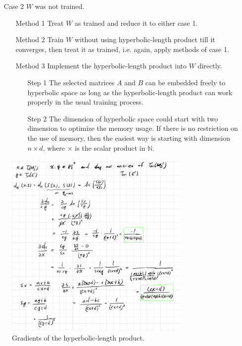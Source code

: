 \documentclass{article}
\theoremstyle{plain}
\theoremstyle{plain} %
\theoremstyle{definition}  %
\theoremstyle{remark}  %
\theoremstyle{plain}
\begin{document}
\begin{itemize}
\begin{itemize}
\item[Case 2] $W$ was not trained.
\begin{itemize}
\item[Method 1] Treat $W$ as trained and reduce it to either case 1.
\item[Method 2] Train $W$ without using hyperbolic-length product till it converges, then treat it as trained, i.e. again, apply methods of case 1.
\item[Method 3] Implement the hyperbolic-length product into $W$ directly.
\begin{itemize}
\item[Step 1] The selected matrices $A$ and $B$ can be embedded freely to hyperbolic space as long as the hyperbolic-length product can work properly in the usual training process.
\item[Step 2] The dimension of hyperbolic space could start with two dimension to optimize the memory usage. If there is no restriction on the use of memory, then the easiest way is starting with dimension $n\times d$, where $\times$ is the scalar product in $\mathbb{N}$.
\end{itemize}
\end{itemize}
\end{itemize}
\end{itemize} 

\begin{figure}[H]
\caption{Gradients of the hyperbolic-length product.}
\centering
\includegraphics[width=0.8\textwidth]{6.png}
\end{figure}
\end{document}
